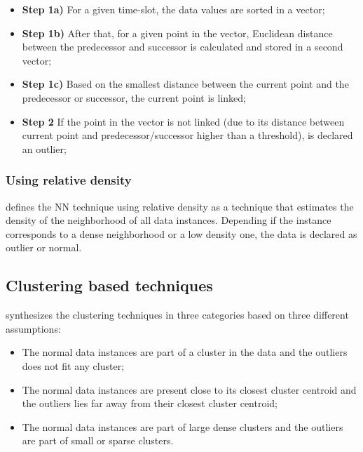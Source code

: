 \begin{itemize}
	
	\setlength\itemsep{-0.5em}
	
	\item \textbf{Step 1a)} For a given time-slot, the data values are sorted in a vector;
	
	\item \textbf{Step 1b)} After that, for a given point in the vector, Euclidean distance between the predecessor and successor is calculated and stored in a second vector;
	
	\item \textbf{Step 1c)} Based on the smallest distance between the current point and the predecessor or successor, the current point is linked;
	
	\item \textbf{Step 2} If the point in the vector is not linked (due to its distance between current point and predecessor/successor higher than a threshold), is declared an outlier;
	
\end{itemize}





\subsubsection{Using relative density}

\cite{gen:chandola:2009} defines the NN technique using relative density as a technique that estimates the density of the neighborhood of all data instances. Depending if the instance corresponds to a dense neighborhood or a low density one, the data is declared as outlier or normal.

\subsection{Clustering based techniques}
\label{sec:clustbased}

\cite{gen:chandola:2009} synthesizes the clustering techniques in three categories based on three different assumptions: 

\begin{itemize}
	
	\setlength\itemsep{-0.5em}
	
	\item The normal data instances are part of a cluster in the data and the outliers does not fit any cluster;
	
	\item The normal data instances are present close to its closest cluster centroid and the outliers lies far away from their closest cluster centroid;
	
	\item The normal data instances are part of large dense clusters and the outliers are part of small or sparse clusters.
	
\end{itemize}

